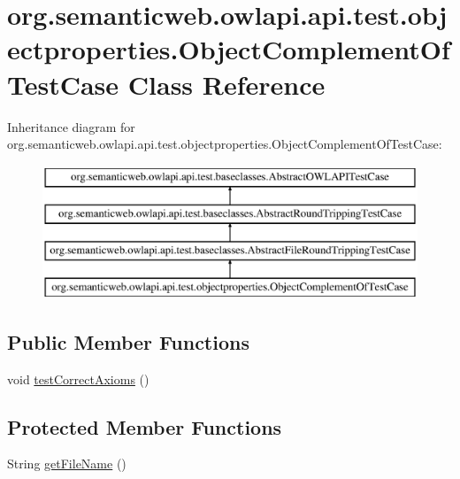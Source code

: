\hypertarget{classorg_1_1semanticweb_1_1owlapi_1_1api_1_1test_1_1objectproperties_1_1_object_complement_of_test_case}{\section{org.\-semanticweb.\-owlapi.\-api.\-test.\-objectproperties.\-Object\-Complement\-Of\-Test\-Case Class Reference}
\label{classorg_1_1semanticweb_1_1owlapi_1_1api_1_1test_1_1objectproperties_1_1_object_complement_of_test_case}
}
Inheritance diagram for org.\-semanticweb.\-owlapi.\-api.\-test.\-objectproperties.\-Object\-Complement\-Of\-Test\-Case\-:\begin{figure}[H]
\begin{center}
\leavevmode
\includegraphics[height=4.000000cm]{classorg_1_1semanticweb_1_1owlapi_1_1api_1_1test_1_1objectproperties_1_1_object_complement_of_test_case}
\end{center}
\end{figure}
\subsection*{Public Member Functions}
\begin{DoxyCompactItemize}
\item 
void \hyperlink{classorg_1_1semanticweb_1_1owlapi_1_1api_1_1test_1_1objectproperties_1_1_object_complement_of_test_case_a6ca7b567bbf5741dfbfd7ade0a37be3b}{test\-Correct\-Axioms} ()
\end{DoxyCompactItemize}
\subsection*{Protected Member Functions}
\begin{DoxyCompactItemize}
\item 
String \hyperlink{classorg_1_1semanticweb_1_1owlapi_1_1api_1_1test_1_1objectproperties_1_1_object_complement_of_test_case_a12b5add4b87c943a07b772d87222729e}{get\-File\-Name} ()
\end{DoxyCompactItemize}


